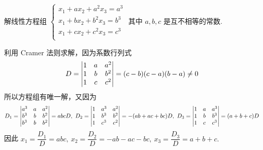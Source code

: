 \begin{example}[2005 华中科技大学]
    解线性方程组 $\begin{cases}
            x_1+ax_2+a^2x_3=a^3 \\
            x_1+bx_2+b^2x_3=b^3 \\
            x_1+cx_2+c^2x_3=c^3 \\
        \end{cases}$
    其中 $a,b,c$ 是互不相等的常数.
\end{example}
\begin{solution}
    利用 Cramer 法则求解，因为系数行列式 $$D=\mqty|1&a&a^2\\1&b&b^2\\1&c&c^2|=(c-b)(c-a)(b-a)\neq0$$
    所以方程组有唯一解，又因为
    $$D_1=\mqty|a^3&a&a^2\\b^3&b&b^2\\b^3&b&b^2|=abcD,~D_2=\mqty|1&a^3&a^2\\1&b^3&b^2\\1&c^3&c^2|=-(ab+ac+bc)D,~D_3=\mqty|1&a&a^3\\1&b&b^3\\1&c&c^3|=(a+b+c)D$$
    因此 $x_1=\dfrac{D_1}{D}=abc,~x_2=\dfrac{D_2}{D}=-ab-ac-bc,~x_3=\dfrac{D_3}{D}=a+b+c.$
\end{solution}
